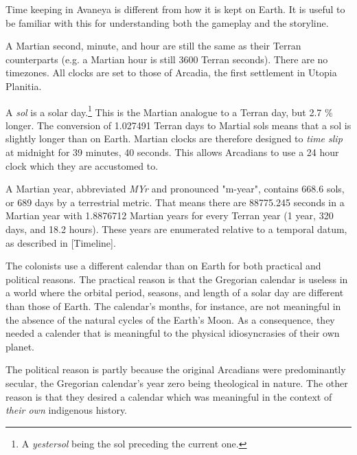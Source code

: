 

Time keeping in Avaneya is different from how it is kept on Earth. It is useful to be familiar with this for understanding both the gameplay and the storyline.


A Martian second, minute, and hour are still the same as their Terran counterparts (e.g. a Martian hour is still 3600 Terran seconds). There are no timezones. All clocks are set to those of Arcadia, the first settlement in Utopia Planitia.

A {\it sol} is a solar day.\footnote{A {\it yestersol} being the sol preceding the current one.} This is the Martian analogue to a Terran day, but 2.7 \% longer. The conversion of 1.027491 Terran days to Martial sols means that a sol is slightly longer than on Earth. Martian clocks are therefore designed to {\it time slip} at midnight for 39 minutes, 40 seconds. This allows Arcadians to use a 24 hour clock which they are accustomed to.

A Martian year, abbreviated {\it MYr} and pronounced "m-year", contains 668.6 sols, or 689 days by a terrestrial metric. That means there are 88775.245 seconds in a Martian year with 1.8876712 Martian years for every Terran year (1 year, 320 days, and 18.2 hours). These years are enumerated relative to a temporal datum, as described in [Timeline].


The colonists use a different calendar than on Earth for both practical and political reasons. The practical reason is that the Gregorian calendar is useless in a world where the orbital period, seasons, and length of a solar day are different than those of Earth. The calendar's months, for instance, are not meaningful in the absence of the natural cycles of the Earth's Moon. As a consequence, they needed a calender that is meaningful to the physical idiosyncrasies of their own planet.

The political reason is partly because the original Arcadians were predominantly secular, the Gregorian calendar's year zero being theological in nature. The other reason is that they desired a calendar which was meaningful in the context of {\it their own} indigenous history.


